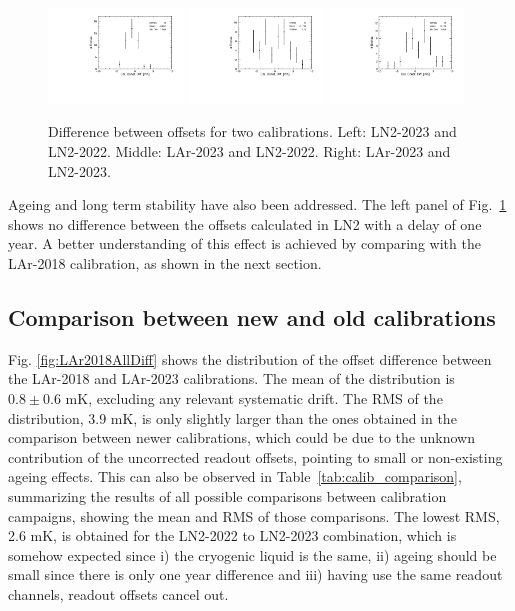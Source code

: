 \begin{figure}[htbp]
\centering
{\includegraphics[width=0.32\textwidth]{images/LN2023-LN2022.pdf}}
{\includegraphics[width=0.32\textwidth]{images/Lar2023-LN2022.pdf}}
{\includegraphics[width=0.32\textwidth]{images/Lar2023-LN2023.pdf}}
\caption{Difference between offsets for two calibrations. Left: LN2-2023 and LN2-2022. Middle: LAr-2023 and LN2-2022. Right:  LAr-2023 and LN2-2023.}
\label{fig:comp_newCalib}
\end{figure}

Ageing and long term stability have also been addressed. The left panel of Fig.~\ref{fig:comp_newCalib} shows no difference between the offsets calculated in LN2 with a delay of one year. A better understanding of this effect is achieved by comparing with the LAr-2018 calibration, as shown in the next section.

\subsection{Comparison between new and old calibrations}
\label{sec:compNewOld}

Fig. \ref{fig:LAr2018AllDiff} shows the distribution of the offset difference between the LAr-2018 and LAr-2023 calibrations. The mean of the distribution is $0.8\pm0.6$ mK, excluding any relevant systematic drift. The RMS of the distribution, 3.9 mK, is only slightly larger than the ones obtained in the comparison between newer calibrations, which could be due to the unknown contribution of the uncorrected readout offsets, pointing to small or non-existing ageing effects. This can also be observed in Table~\ref{tab:calib_comparison}, summarizing the results of all possible comparisons between calibration campaigns, showing the mean and RMS of those comparisons. The lowest RMS, 2.6 mK, is obtained for the LN2-2022 to LN2-2023 combination, which is somehow expected since i) the cryogenic liquid is the same, ii) ageing should be small since there is only one year difference and iii) having use the same readout channels, readout offsets cancel out.

